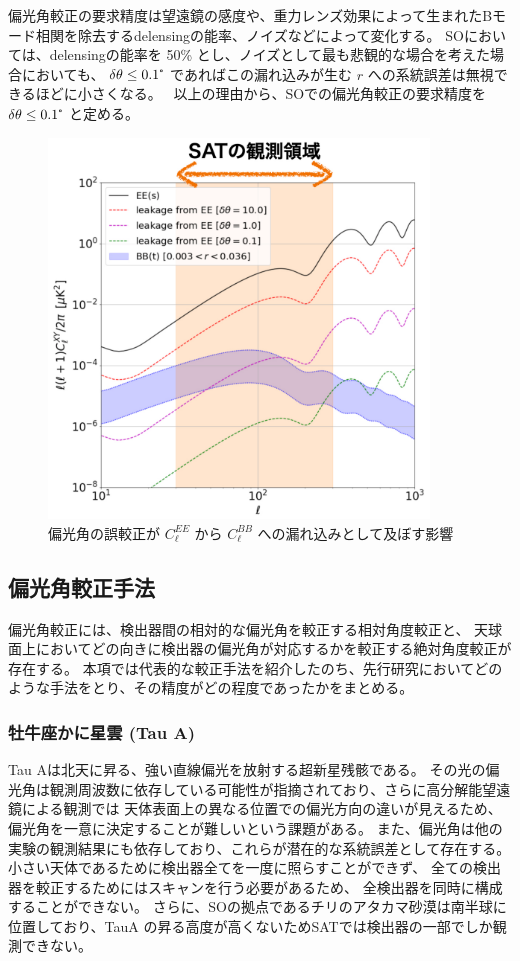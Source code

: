 \documentclass[../../main.tex]{subfiles}
\begin{document}
偏光角較正の要求精度は望遠鏡の感度や、重力レンズ効果によって生まれたBモード相関を除去するdelensingの能率、ノイズなどによって変化する。
SOにおいては、delensingの能率を 50\% とし、ノイズとして最も悲観的な場合を考えた場合においても、
$\delta\theta \leq 0.1\tcdegree$ であればこの漏れ込みが生む $r$ への系統誤差は無視できるほどに小さくなる。~\cite{so:Bryan_2018}
以上の理由から、SOでの偏光角較正の要求精度を $\delta\theta \leq 0.1\tcdegree$ と定める。

\begin{figure}[H]
    \centering
    \includegraphics[width=0.9\textwidth]{simons_observatory/EtoB_leakage.pdf}
    \caption{偏光角の誤較正が $C_{\ell}^{EE}$ から $C_{\ell}^{BB}$ への漏れ込みとして及ぼす影響}
    \label{fig:so-EtoBleakage}
\end{figure}

\subsection{偏光角較正手法}
偏光角較正には、検出器間の相対的な偏光角を較正する相対角度較正と、
天球面上においてどの向きに検出器の偏光角が対応するかを較正する絶対角度較正が存在する。
本項では代表的な較正手法を紹介したのち、先行研究においてどのような手法をとり、その精度がどの程度であったかをまとめる。
\subsubsection{牡牛座かに星雲 (Tau A)}
Tau Aは北天に昇る、強い直線偏光を放射する超新星残骸である。
その光の偏光角は観測周波数に依存している可能性が指摘されており、さらに高分解能望遠鏡による観測では
天体表面上の異なる位置での偏光方向の違いが見えるため、偏光角を一意に決定することが難しいという課題がある。
また、偏光角は他の実験の観測結果にも依存しており、これらが潜在的な系統誤差として存在する。
小さい天体であるために検出器全てを一度に照らすことができず、
全ての検出器を較正するためにはスキャンを行う必要があるため、
全検出器を同時に構成することができない。
さらに、SOの拠点であるチリのアタカマ砂漠は南半球に位置しており、TauA の昇る高度が高くないためSATでは検出器の一部でしか観測できない。
\end{document}
